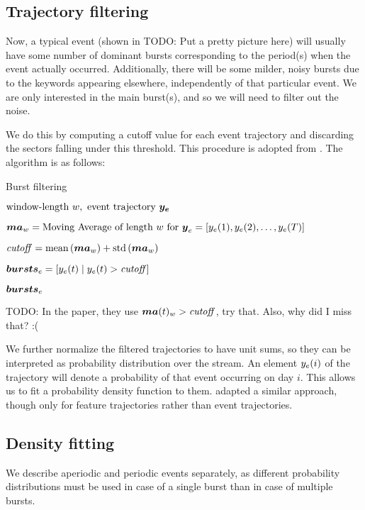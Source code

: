 \subsection{Trajectory filtering}

Now, a typical event (shown in {\color{red} TODO: Put a pretty picture here}) will usually have some number of dominant bursts corresponding to the period(s) when the event actually occurred. Additionally, there will be some milder, noisy bursts due to the keywords appearing elsewhere, independently of that particular event. We are only interested in the main burst(s), and so we will need to filter out the noise.

We do this by computing a cutoff value for each event trajectory and discarding the sectors falling under this threshold. This procedure is adopted from \cite{online-search-queries}. The algorithm is as follows:

\begin{algorithm}[H]
\begin{algorithmic}[1]
\caption{Burst filtering}
\Input $\text{window-length} \ w,\ \text{event trajectory} \ \vect{\traj_{e}}$

\State $\vect{MA}_{w} = \text{Moving Average of length} ~ w ~ \text{for} ~ \vect{\traj}_{e} = \left[ \traj_{e}(1), \traj_{e}(2), \dots, \traj_{e}(\streamlen) \right]$

\State $\mathit{cutoff} = \text{mean} \left( \vect{MA}_{w} \right) + \text{std} \left( \vect{MA}_{w} \right)$

\State $\vect{bursts}_{e} = \left[ \traj_{e}(t) \mid \traj_{e}(t) > \mathit{cutoff} \right]$

\Output $\vect{bursts}_{e}$
\end{algorithmic}
\end{algorithm}

{\color{red} TODO: In the paper, they use $\vect{MA}(t)_{w} > \mathit{cutoff}$, try that. Also, why did I miss that? :(}

We further normalize the filtered trajectories to have unit sums, so they can be interpreted as probability distribution over the stream. An element $y_{e}(i)$ of the trajectory will denote a probability of that event occurring on day $i$. This allows us to fit a probability density function to them. \cite{event-detection} adapted a similar approach, though only for feature trajectories rather than event trajectories.

\subsection{Density fitting}
We describe aperiodic and periodic events separately, as different probability distributions must be used in case of a single burst than in case of multiple bursts.

